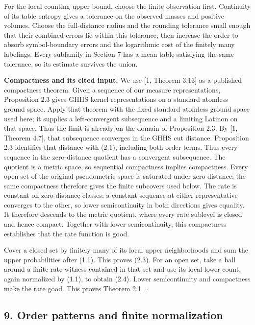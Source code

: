 \documentclass[english,11pt,a4paper]{article}
\begin{document}
For the local counting upper bound, choose the finite observation first. Continuity of its table entropy gives a tolerance on the observed masses and positive volumes. Choose the full-distance radius and the rounding tolerance small enough that their combined errors lie within this tolerance; then increase the order to absorb symbol-boundary errors and the logarithmic cost of the finitely many labelings. Every subfamily in Section 7 has a mean table satisfying the same tolerance, so its estimate survives the union.

\textbf{Compactness and its cited input.} We use {[}1, Theorem 3.13{]} as a published compactness theorem. Given a sequence of our measure representations, Proposition 2.3 gives GHHS kernel representations on a standard atomless ground space. Apply that theorem with the fixed standard atomless ground space used here; it supplies a left-convergent subsequence and a limiting Latinon on that space. Thus the limit is already on the domain of Proposition 2.3. By {[}1, Theorem 4.7{]}, that subsequence converges in the GHHS cut distance. Proposition 2.3 identifies that distance with (2.1), including both order terms. Thus every sequence in the zero-distance quotient has a convergent subsequence. The quotient is a metric space, so sequential compactness implies compactness. Every open set of the original pseudometric space is saturated under zero distance; the same compactness therefore gives the finite subcovers used below. The rate is constant on zero-distance classes: a constant sequence at either representative converges to the other, so lower semicontinuity in both directions gives equality. It therefore descends to the metric quotient, where every rate sublevel is closed and hence compact. Together with lower semicontinuity, this compactness establishes that the rate function is good.

Cover a closed set by finitely many of its local upper neighborhoods and sum the upper probabilities after (1.1). This proves (2.3). For an open set, take a ball around a finite-rate witness contained in that set and use its local lower count, again normalized by (1.1), to obtain (2.4). Lower semicontinuity and compactness make the rate good. This proves Theorem 2.1. \(\square\)

\subsection{9. Order patterns and finite normalization}\label{order-patterns-and-finite-normalization}
\end{document}
